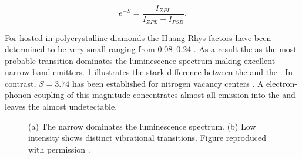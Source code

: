    \begin{equation}
     e^{-S} = \frac{I_{ZPL}}{I_{ZPL} + I_{PSB}}.
   \end{equation}

   For \sivs hosted in polycrystalline diamonds the Huang-Rhys factors have been determined to be very small ranging from \SIrange{0.08}{0.24}{} \cite{Duligall2006,Yuan2002,Nothaft2012}. As a result the \zpl as the most probable transition dominates the luminescence spectrum making \sivs excellent narrow-band emitters. \cref{fig::spectral_features} illustrates the stark difference between the \zpl and the \psb. In contrast, $S=3.74$ has been established for nitrogen vacancy centers \cite{Davies1981}. A electron-phonon coupling of this magnitude concentrates almost all emission into the \psb and leaves the \zpl almost undetectable.

   \begin{figure}[thbp]
 		\begin{subfigure}[t]{ 0.49\linewidth}
 			\centering
 			\caption{}
 		\end{subfigure}
 		\hfill
 		\begin{subfigure}[t]{ 0.49\linewidth}
 			\centering
 			\caption{}
 		\end{subfigure}
 		\caption[Fluorescence spectra of \sivs at room temperature]{(a) The narrow \zpl dominates the luminescence spectrum. (b) Low intensity \psb shows distinct vibrational transitions. Figure reproduced with permission \cite{Riedrich-moller2014}.}
 		\label{fig::spectral_features}
 	\end{figure}



